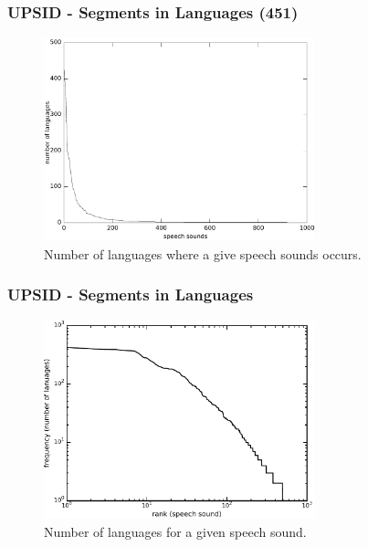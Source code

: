 \documentclass{beamer}
\begin{document}
\frame
{
  \frametitle{UPSID - Segments in Languages (451)}
  
  \begin{figure}[h!]
  \centering
  \includegraphics[width=0.7\textwidth]{images/occ_of_speech_sounds_plot.pdf}
  \caption{Number of languages where a give speech sounds occurs.}
  \label{fig:occ_of_speech_sounds_plot}
  \end{figure}
}

\frame
{
  \frametitle{UPSID - Segments in Languages}

  \begin{figure}[h!]
  \centering
  \includegraphics[width=0.7\textwidth]{images/occ_of_speech_sounds_plotlog.pdf}
  \caption{Number of languages for a given speech sound.}
  \label{fig:occ_of_speech_sounds_plotlog}
  \end{figure}
}
\end{document}
